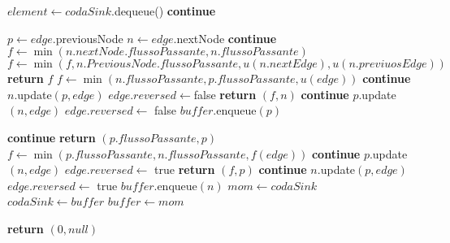 \documentclass{article}
\begin{document}
\begin{algorithm}
    \begin{algorithmic}
        \STATE $element \leftarrow codaSink.$dequeue()
        \STATE \textbf{continue}
        \ENDIF

        \STATE $p \leftarrow edge.$previousNode
        \STATE $n \leftarrow edge$.nextNode
        \STATE \textbf{continue}
        \ELSE
        \STATE $f \leftarrow \min (n.nextNode.flussoPassante, n.flussoPassante) $
        \STATE $f \leftarrow \min(f,n.PreviousNode.flussoPassante, u(n.nextEdge), u(n.previuosEdge))$
        \STATE \textbf{return} $f$
        \ENDIF
        \ENDIF
        \STATE $f \leftarrow \min (n.flussoPassante,p.flussoPassante,u(edge))$
        \STATE \textbf{continue}
        \ENDIF
        \STATE $n$.update$(p,edge)$
        \STATE $edge.reversed \leftarrow $false
        \STATE \textbf{return} $(f,n)$
        \ENDIF
        \ENDIF
        \STATE \textbf{continue}
        \ENDIF
        \STATE $p.$update$(n,edge)$
        \STATE $edge.reversed \leftarrow$ false
        \STATE $buffer.$enqueue$(p)$
    \end{algorithmic}
\end{algorithm}
\newpage
\begin{algorithm}
    \begin{algorithmic}
        \STATE \textbf{continue}
        \ELSE
        \STATE \textbf{return} $(p.flussoPassante,p)$
        \ENDIF
        \STATE $f \leftarrow \min(p.flussoPassante,n.flussoPassante,f(edge))$
        \STATE \textbf{continue}
        \ENDIF
        \STATE $p.$update$(n,edge)$
        \STATE $edge.reversed \leftarrow$ true
        \STATE \textbf{return } $(f,p)$
        \ENDIF
        \ENDIF
        \STATE \textbf{continue}
        \ENDIF
        \STATE $n.$update$(p,edge)$
        \STATE $edge.reversed \leftarrow$ true
        \STATE $buffer.$enqueue$(n)$
        \ENDIF
        \ENDFOR
        \ENDWHILE
        \STATE $mom \leftarrow codaSink$
        \STATE $codaSink \leftarrow buffer$
        \STATE $buffer \leftarrow mom$

        \ENDWHILE
        \STATE \textbf{return} $(0,null)$
    \end{algorithmic}
\end{algorithm}
\end{document}
